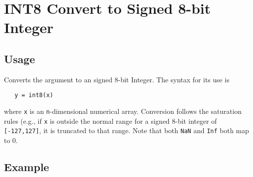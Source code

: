 \section{INT8 Convert to Signed 8-bit Integer}

\subsection{Usage}

Converts the argument to an signed 8-bit Integer.  The syntax
for its use is
\begin{verbatim}
   y = int8(x)
\end{verbatim}
where \verb|x| is an \verb|n|-dimensional numerical array.  Conversion
follows the saturation rules (e.g., if \verb|x| is outside the normal
range for a signed 8-bit integer of \verb|[-127,127]|, it is truncated to that
range.  Note that
both \verb|NaN| and \verb|Inf| both map to 0.
\subsection{Example}

